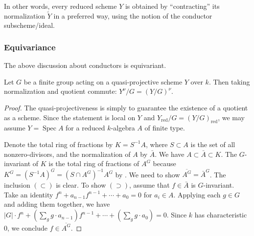 \documentclass[reqno, letterpaper]{amsart}
\numberwithin{equation}{subsection}
\DeclareMathOperator{\Spec}{Spec}
\DeclareMathOperator{\red}{red}
\begin{document}
		In other words, every reduced scheme $Y$ is obtained by ``contracting'' its normalization $\tilde Y$ in a preferred way, using the notion of the conductor subscheme/ideal.
		
		
		
		\subsubsection{Equivariance}
			The above discussion about conductors is equivariant.
			
			\begin{lemma} \label{lem:quotient and normalization}
				Let $G$ be a finite group acting on a quasi-projective scheme $Y$ over $k$. Then taking normalization and quotient commute: $Y^\nu / G = (Y/G)^\nu$.
			\end{lemma}
			\begin{proof}
				The quasi-projectiveness is simply to guarantee the existence of a quotient as a scheme. Since the statement is local on $Y$ and $Y_{\red}/G = (Y/G)_{\red}$, we may assume $Y = \Spec A$ for a reduced $k$-algebra $A$ of finite type.
				
				Denote the total ring of fractions by $K = S^{-1} A$, where $S \subset A$ is the set of all nonzero-divisors, and the normalization of $A$ by $\bar A$. We have $A \subset \bar A \subset K$. The $G$-invariant of $K$ is the total ring of fractions of $A^G$ because $K^G = (S^{-1}A)^G = (S \cap A^G)^{-1} A^G$ by \cite[Exercise~5.12]{ati-mac:commutative}. We need to show $\overline{A^G} = \bar A^G$. The inclusion $(\subset)$ is clear. To show $(\supset)$, assume that $f \in \bar A$ is $G$-invariant. Take an identity $f^n + a_{n-1} f^{n-1} + \cdots + a_0 = 0$ for $a_i \in A$. Applying each $g \in G$ and adding them together, we have $|G| \cdot f^n + (\sum_g g \cdot a_{n-1}) f^{n-1} + \cdots + (\sum_g g \cdot a_0) = 0$. Since $k$ has characteristic $0$, we conclude $f \in \overline{A^G}$.
			\end{proof}
			
\end{document}
